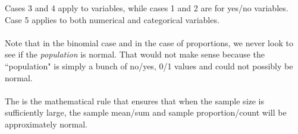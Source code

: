 \noindent Cases 3 and 4 apply to  variables, while cases 1 and 2 are for  yes/no variables.  Case 5 applies to both numerical and categorical variables.
\\
\\Note that in the binomial case and in the case of proportions, we never look to see if the \emph{population} is normal.  That would not make sense because the ``population" is simply a bunch of no/yes, 0/1 values and could not possibly be normal.
\\
\\The {} is the mathematical rule that ensures that when the sample size is sufficiently large, the sample mean/sum and sample proportion/count will be approximately normal.  
\\
\\
